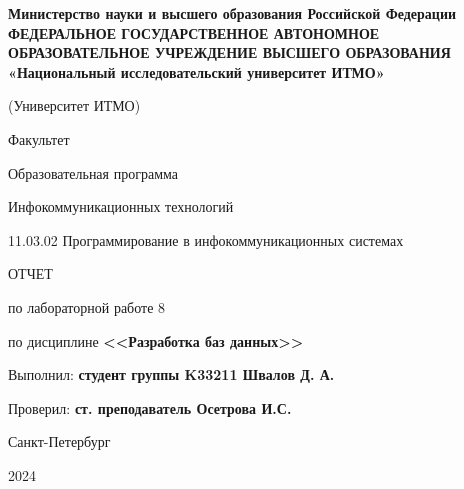 \documentclass[a4paper, 14pt]{extarticle}
\begin{document}
\begin{titlepage}
  \vspace{0pt plus2fill}
  \noindent

  \vspace{0pt plus6fill}
  \begin{center}
    {
    \bfseries
    Министерство науки и высшего образования Российской Федерации
    {
    \scriptsize
    ФЕДЕРАЛЬНОЕ ГОСУДАРСТВЕННОЕ АВТОНОМНОЕ ОБРАЗОВАТЕЛЬНОЕ УЧРЕЖДЕНИЕ ВЫСШЕГО
    ОБРАЗОВАНИЯ
    }
    «Национальный исследовательский университет ИТМО»

    (Университет ИТМО)

    \begin{minipage}[t]{0.42\textwidth}
      \vspace*{0pt}
      \begin{flushright}
        Факультет

        Образовательная программа
      \end{flushright}
    \end{minipage}
    \begin{minipage}[t]{0.57\textwidth}
      \vspace*{0pt}
      \begin{flushright}
        Инфокоммуникационных технологий

        11.03.02 Программирование в инфокоммуникационных системах
      \end{flushright}
    \end{minipage}
    }

    \vspace{0pt plus5fill}

    \LARGE{
      ОТЧЕТ

      по лабораторной работе 8

      по дисциплине \textbf{<<Разработка баз данных>>}
    }
  \end{center}

  \vspace{0pt plus4fill}
  \begin{flushright}
    Выполнил: \textbf{студент группы K33211 Швалов Д. А.}

    Проверил: \textbf{ст. преподаватель Осетрова И.С.}
  \end{flushright}

  \vspace{0pt plus8fill}
  \begin{center}
    Санкт-Петербург

    2024
  \end{center}
\end{titlepage}
\end{document}
